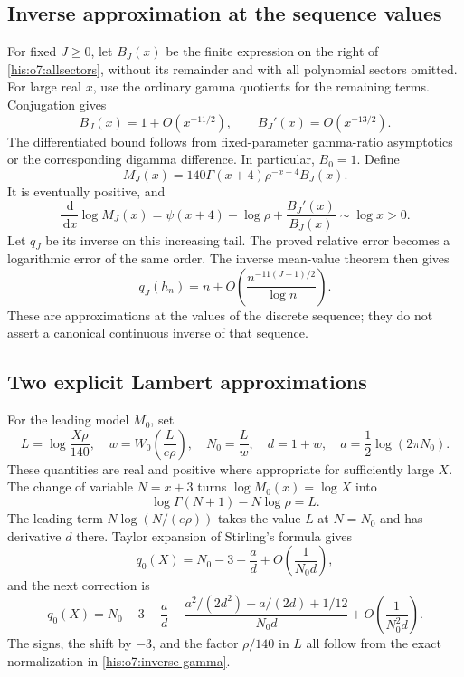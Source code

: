 \documentclass[11pt]{article}
\theoremstyle{remark}\newtheorem{remark}[theorem]{Remark}
\newcommand{\dd}{\,\mathrm d}
\numberwithin{equation}{section}
\begin{document}
\subsection{Inverse approximation at the sequence values}
For fixed $J\ge0$, let $B_J(x)$ be the finite expression on the
right of \eqref{his:o7:allsectors}, without its remainder and
with all polynomial sectors omitted. For large real $x$, use the
ordinary gamma quotients for the remaining terms. Conjugation gives
\[
B_J(x)=1+O(x^{-11/2}),\qquad B_J'(x)=O(x^{-13/2}).
\]
The differentiated bound follows from fixed-parameter gamma-ratio
asymptotics or the corresponding digamma difference. In particular,
$B_0=1$. Define
\begin{equation}\label{his:o7:model}
M_J(x)=140\Gamma(x+4)\rho^{-x-4}B_J(x).
\end{equation}
It is eventually positive, and
\[
\frac{\dd}{\dd x}\log M_J(x)
=\psi(x+4)-\log\rho+\frac{B_J'(x)}{B_J(x)}\sim\log x>0.
\]
Let $q_J$ be its inverse on this increasing tail. The proved
relative error becomes a logarithmic error of the same order.
The inverse mean-value theorem then gives
\begin{equation}\label{his:o7:inverse-error}
q_J(h_n)=n+O\!\left(\frac{n^{-11(J+1)/2}}{\log n}\right).
\end{equation}
These are approximations at the values of the discrete sequence;
they do not assert a canonical continuous inverse of that sequence.

\subsection{Two explicit Lambert approximations}
For the leading model $M_0$, set
\begin{equation}\label{his:o7:lambert-start}
L=\log\frac{X\rho}{140},\quad
w=W_0\!\left(\frac{L}{e\rho}\right),\quad
N_0=\frac Lw,\quad d=1+w,\quad
 a=\frac12\log(2\pi N_0).
\end{equation}
These quantities are real and positive where appropriate for
sufficiently large $X$. The change of variable $N=x+3$ turns
$\log M_0(x)=\log X$ into
\begin{equation}\label{his:o7:inverse-gamma}
\log\Gamma(N+1)-N\log\rho=L.
\end{equation}
The leading term $N\log(N/(e\rho))$ takes the value $L$ at
$N=N_0$ and has derivative $d$ there.
Taylor expansion of Stirling's formula gives
\begin{equation}\label{his:o7:lambert-one}
q_0(X)=N_0-3-\frac ad+O\!\left(\frac1{N_0d}\right),
\end{equation}
and the next correction is
\begin{equation}\label{his:o7:lambert-two}
q_0(X)=N_0-3-\frac ad
-\frac{a^2/(2d^2)-a/(2d)+1/12}{N_0d}
+O\!\left(\frac1{N_0^2d}\right).
\end{equation}
The signs, the shift by $-3$, and the factor $\rho/140$ in $L$
all follow from the exact normalization in \eqref{his:o7:inverse-gamma}.
\end{document}
